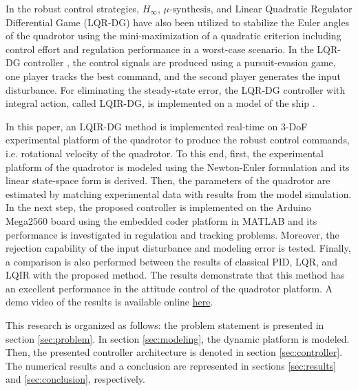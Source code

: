 \documentclass[3p]{elsarticle}
\begin{document}
In the robust control strategies, $H_{\infty}$, $\mu\text{-synthesis}$, and Linear Quadratic Regulator Differential Game (LQR-DG) \cite{10025263} have also been utilized to stabilize the Euler angles of the quadrotor using the mini-maximization of a quadratic criterion including control effort and regulation performance in a worst-case scenario. In the LQR-DG controller \cite{GLIZER201522, 6160768}, the control signals are produced using a pursuit-evasion game, one player tracks the best command, and the second player generates the input disturbance. For eliminating the steady-state error, the LQR-DG controller with integral action, called LQIR-DG, is implemented on a model of the ship \cite{6957349}.

In this paper, an LQIR-DG method is implemented real-time on 3-DoF experimental platform of the quadrotor to produce the robust control commands, i.e. rotational velocity of the quadrotor.
To this end, first, the experimental platform of the quadrotor is modeled using the Newton-Euler formulation and its linear state-space form is derived.
Then, the parameters of the quadrotor are estimated by matching experimental data with results from the model simulation.
In the next step, the proposed controller is implemented on the Arduino Mega2560 board using the embedded coder platform in MATLAB and its performance is investigated in regulation and tracking problems.
Moreover, the rejection capability of the input disturbance and modeling error is tested.
Finally, a comparison is also performed between the results of classical PID, LQR, and LQIR with the proposed method. The results demonstrate that this method has an excellent performance in the attitude control of the quadrotor platform.
A demo video of the results is available online
\href{https://drive.google.com/drive/folders/1DIJs3wmIpmwI8slyHeitA6Ebe-khKTCt?usp=share_link}{here}.


This research is organized as follows: the problem statement is presented in section \ref{sec:problem}. In section \ref{sec:modeling}, the dynamic
platform is modeled. Then, the presented controller architecture is denoted in section \ref{sec:controller}. The numerical results and a conclusion are represented in sections \ref{sec:results} and
\ref{sec:conclusion}, respectively.


\end{document}
